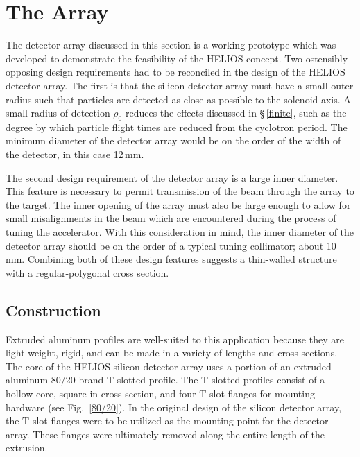 \section{The Array}
\label{array}
The detector array discussed in this section is a working prototype which was developed to demonstrate the feasibility of the HELIOS concept.  Two ostensibly opposing design requirements had to be reconciled in the design of the HELIOS detector array.  The first is that the silicon detector array must have a small outer radius such that particles are detected as close as possible to the solenoid axis.  A small radius of detection $\rho_0$ reduces the effects discussed in \S\,\ref{finite}, such as the degree by which particle flight times are reduced from the cyclotron period.  The minimum diameter of the detector array would be on the order of the width of the detector, in this case 12\,mm.

The second design requirement of the detector array is a large inner diameter.  This feature is necessary to permit transmission of the beam through the array to the target.  The inner opening of the array must also be large enough to allow for small misalignments in the beam which are encountered during the process of tuning the accelerator.  With this consideration in mind, the inner diameter of the detector array should be on the order of a typical tuning collimator; about 10\,mm.  Combining both of these design features suggests a thin-walled structure with a regular-polygonal cross section.

\subsection{Construction}
Extruded aluminum profiles are well-suited to this application because they are light-weight, rigid, and can be made in a variety of lengths and cross sections.  The core of the HELIOS silicon detector array uses a portion of an extruded aluminum 80/20 brand T-slotted profile.  The T-slotted profiles consist of a hollow core, square in cross section, and four T-slot flanges for mounting hardware (see Fig.~\ref{80/20}).  In the original design of the silicon detector array, the T-slot flanges were to be utilized as the mounting point for the detector array.  These flanges were ultimately removed along the entire length of the extrusion.

